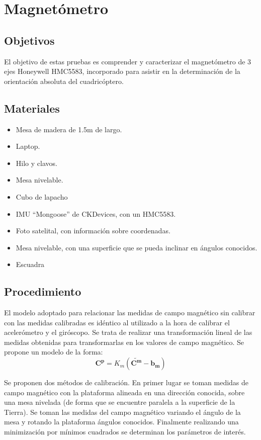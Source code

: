 \documentclass[main]{subfiles}
\begin{document}
\chapter{Magnetómetro}
\label{chap:magnetometro}

\section{Objetivos}

El objetivo de estas pruebas es comprender y caracterizar el magnetómetro de 3 ejes Honeywell HMC5583, incorporado para asistir en la determinación de la orientación absoluta del cuadricóptero.

\section{Materiales}
\label{sec:materiales}

\begin{itemize}
\item Mesa de madera de 1.5m de largo.
\item Laptop.
\item Hilo y clavos.
\item Mesa nivelable.
\item Cubo de lapacho
\item IMU ``Mongoose'' de CKDevices, con un HMC5583.
\item Foto satelital, con información sobre coordenadas.
\item Mesa nivelable, con una superficie que se pueda inclinar en ángulos conocidos.
\item Escuadra
\end{itemize}

\newpage

\section{Procedimiento}
\label{sec:procedimiento}

El modelo adoptado para relacionar las medidas de campo magnético sin calibrar con las medidas calibradas es idéntico al utilizado a la hora de calibrar el acelerómetro y el giróscopo. Se trata de realizar una transformación lineal de las medidas obtenidas para transformarlas en los valores de campo magnético. Se propone un modelo de la forma:
$$
\mathbf{C^p} =K_m (\mathbf{\tilde{C^m}} -  \mathbf{b_m})
$$

Se proponen dos métodos de calibración. En primer lugar se toman medidas de campo magnético con la plataforma alineada en una dirección conocida, sobre una mesa nivelada (de forma que se encuentre paralela a la superficie de la Tierra). Se toman las medidas del campo magnético variando el ángulo de la mesa y rotando la plataforma ángulos conocidos. Finalmente realizando una minimización por mínimos cuadrados se determinan los parámetros de interés.  
\end{document}

